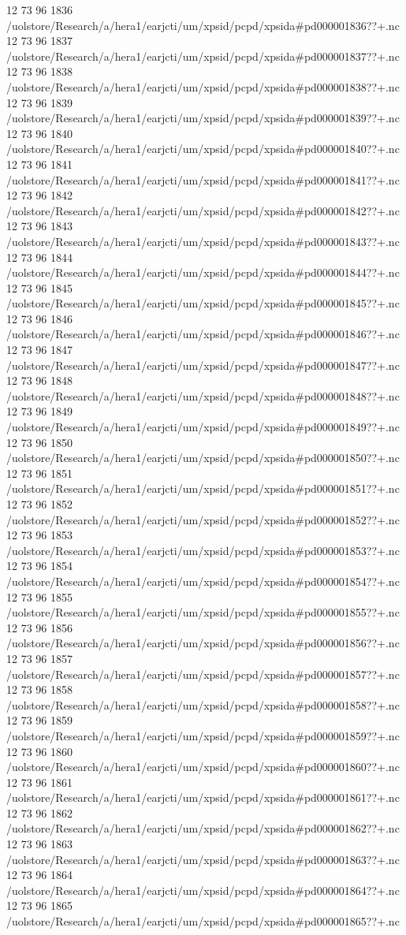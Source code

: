 12 73 96
1836
/uolstore/Research/a/hera1/earjcti/um/xpsid/pcpd/xpsida#pd000001836??+.nc
12 73 96
1837
/uolstore/Research/a/hera1/earjcti/um/xpsid/pcpd/xpsida#pd000001837??+.nc
12 73 96
1838
/uolstore/Research/a/hera1/earjcti/um/xpsid/pcpd/xpsida#pd000001838??+.nc
12 73 96
1839
/uolstore/Research/a/hera1/earjcti/um/xpsid/pcpd/xpsida#pd000001839??+.nc
12 73 96
1840
/uolstore/Research/a/hera1/earjcti/um/xpsid/pcpd/xpsida#pd000001840??+.nc
12 73 96
1841
/uolstore/Research/a/hera1/earjcti/um/xpsid/pcpd/xpsida#pd000001841??+.nc
12 73 96
1842
/uolstore/Research/a/hera1/earjcti/um/xpsid/pcpd/xpsida#pd000001842??+.nc
12 73 96
1843
/uolstore/Research/a/hera1/earjcti/um/xpsid/pcpd/xpsida#pd000001843??+.nc
12 73 96
1844
/uolstore/Research/a/hera1/earjcti/um/xpsid/pcpd/xpsida#pd000001844??+.nc
12 73 96
1845
/uolstore/Research/a/hera1/earjcti/um/xpsid/pcpd/xpsida#pd000001845??+.nc
12 73 96
1846
/uolstore/Research/a/hera1/earjcti/um/xpsid/pcpd/xpsida#pd000001846??+.nc
12 73 96
1847
/uolstore/Research/a/hera1/earjcti/um/xpsid/pcpd/xpsida#pd000001847??+.nc
12 73 96
1848
/uolstore/Research/a/hera1/earjcti/um/xpsid/pcpd/xpsida#pd000001848??+.nc
12 73 96
1849
/uolstore/Research/a/hera1/earjcti/um/xpsid/pcpd/xpsida#pd000001849??+.nc
12 73 96
1850
/uolstore/Research/a/hera1/earjcti/um/xpsid/pcpd/xpsida#pd000001850??+.nc
12 73 96
1851
/uolstore/Research/a/hera1/earjcti/um/xpsid/pcpd/xpsida#pd000001851??+.nc
12 73 96
1852
/uolstore/Research/a/hera1/earjcti/um/xpsid/pcpd/xpsida#pd000001852??+.nc
12 73 96
1853
/uolstore/Research/a/hera1/earjcti/um/xpsid/pcpd/xpsida#pd000001853??+.nc
12 73 96
1854
/uolstore/Research/a/hera1/earjcti/um/xpsid/pcpd/xpsida#pd000001854??+.nc
12 73 96
1855
/uolstore/Research/a/hera1/earjcti/um/xpsid/pcpd/xpsida#pd000001855??+.nc
12 73 96
1856
/uolstore/Research/a/hera1/earjcti/um/xpsid/pcpd/xpsida#pd000001856??+.nc
12 73 96
1857
/uolstore/Research/a/hera1/earjcti/um/xpsid/pcpd/xpsida#pd000001857??+.nc
12 73 96
1858
/uolstore/Research/a/hera1/earjcti/um/xpsid/pcpd/xpsida#pd000001858??+.nc
12 73 96
1859
/uolstore/Research/a/hera1/earjcti/um/xpsid/pcpd/xpsida#pd000001859??+.nc
12 73 96
1860
/uolstore/Research/a/hera1/earjcti/um/xpsid/pcpd/xpsida#pd000001860??+.nc
12 73 96
1861
/uolstore/Research/a/hera1/earjcti/um/xpsid/pcpd/xpsida#pd000001861??+.nc
12 73 96
1862
/uolstore/Research/a/hera1/earjcti/um/xpsid/pcpd/xpsida#pd000001862??+.nc
12 73 96
1863
/uolstore/Research/a/hera1/earjcti/um/xpsid/pcpd/xpsida#pd000001863??+.nc
12 73 96
1864
/uolstore/Research/a/hera1/earjcti/um/xpsid/pcpd/xpsida#pd000001864??+.nc
12 73 96
1865
/uolstore/Research/a/hera1/earjcti/um/xpsid/pcpd/xpsida#pd000001865??+.nc
